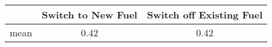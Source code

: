 {
\def\sym#1{\ifmmode^{#1}\else\(^{#1}\)\fi}
\begin{tabular}{l*{1}{cc}}
\hline\hline
            &Switch to New Fuel&Switch off Existing Fuel\\
\hline
mean        &        0.42&        0.42\\
\hline\hline
\end{tabular}
}

